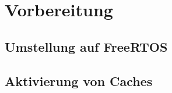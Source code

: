 \section{Vorbereitung}

\subsection{Umstellung auf FreeRTOS}


\newpage

\subsection{Aktivierung von Caches}
